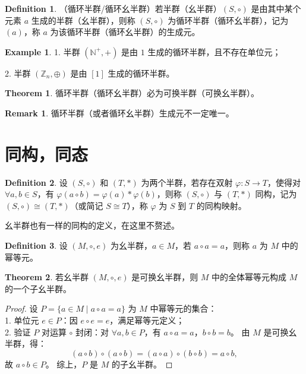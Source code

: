 \documentclass[oneside]{book}
\theoremstyle{definition}
\newtheorem{example}{Example}[section]
\newtheorem{definition}{Definition}[section]
\newtheorem{theorem}{Theorem}[section]
\newtheorem{remark}{Remark}[section]
\begin{document}
\begin{definition}
	（循环半群/循环幺半群）若半群（幺半群）\( (S, \circ) \) 是由其中某个元素 \( a \) 生成的半群（幺半群），则称 \( (S, \circ) \) 为循环半群（循环幺半群），记为 \( (a) \)，称 \( a \) 为该循环半群（循环幺半群）的生成元。
\end{definition}

\begin{example}
	1. 半群 \( (\mathbb{N}^+, +) \) 是由 \( 1 \) 生成的循环半群，且不存在单位元；
	
	2. 半群 \( (\mathbb{Z}_n, \oplus) \) 是由 \( [1] \) 生成的循环半群。
\end{example}

\begin{theorem}
	循环半群（循环幺半群）必为可换半群（可换幺半群）。
\end{theorem}
\begin{remark}
	循环半群（或者循环幺半群）生成元不一定唯一。
\end{remark}
\section{同构，同态}

\begin{definition}
	设 \( (S, \circ) \) 和 \( (T, *) \) 为两个半群，若存在双射 \( \varphi: S \to T \)，使得对 \( \forall a, b \in S \)，有 \( \varphi(a \circ b) = \varphi(a) * \varphi(b) \)，则称 \( (S, \circ) \) 与 \( (T, *) \) 同构，记为 \( (S, \circ) \cong (T, *) \)（或简记 \( S \cong T \)），称 \( \varphi \) 为 \( S \) 到 \( T \) 的同构映射。
\end{definition}
幺半群也有一样的同构的定义，在这里不赘述。

\begin{definition}
	设 \( (M, \circ, e) \) 为幺半群，\( a \in M \)，若 \( a \circ a = a \)，则称 \( a \) 为 \( M \) 中的幂等元。
\end{definition}

\begin{theorem}
	若幺半群 \( (M, \circ, e) \) 是可换幺半群，则 \( M \) 中的全体幂等元构成 \( M \) 的一个子幺半群。
\end{theorem}

\begin{proof}
	设 \( P = \{ a \in M \mid a \circ a = a \} \) 为 \( M \) 中幂等元的集合：\\
	1. 单位元 \( e \in P \)：因 \( e \circ e = e \)，满足幂等元定义；\\
	2. 验证 \( P \) 对运算 \( \circ \) 封闭：对 \( \forall a, b \in P \)，有 \( a \circ a = a \)，\( b \circ b = b \)。
	由 \( M \) 是可换幺半群，得：
	\[
	(a \circ b) \circ (a \circ b) = (a \circ a) \circ (b \circ b) = a \circ b,
	\]
	故 \( a \circ b \in P \)。
	综上，\( P \) 是 \( M \) 的子幺半群。
\end{proof}
\end{document}
